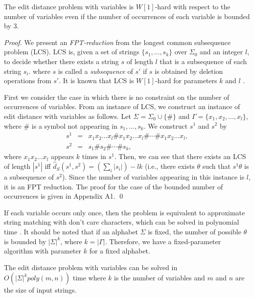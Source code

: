 \documentclass[a4paper]{llncs}
\begin{document}
\begin{theorem}
The edit distance problem with variables is $W[1]$-hard with respect to
the number of variables even if the number of occurrences of each variable
is bounded by 3.
\label{thm:edhard}
\end{theorem}
\begin{proof}
We present an \emph{FPT-reduction} \cite{flum06}
from the longest common subsequence problem (LCS).
LCS is, given a set of strings $\{s_1,\ldots,s_k\}$ over $\Sigma_0$ and 
an integer $l$,
to decide whether there exists a string $s$ of length $l$
that is a subsequence of each string $s_i$.
where $s$ is called a \emph{subsequence} of $s'$ if $s$ is obtained by
deletion operations from $s'$.
It is known that LCS is $W[1]$-hard
for parameters $k$ and $l$ \cite{bodlaender95}.

First we consider the case in which there is no constraint on the number
of occurrences of variables.
From an instance of LCS, we construct an instance of
edit distance with variables as follows.
Let $\Sigma=\Sigma_0 \cup \{ \# \}$ and $\Gamma=\{x_1,x_2,\ldots,x_l\}$,
where $\#$ is a symbol not appearing in $s_1,\ldots,s_k$.
We construct $s^1$ and $s^2$ by
\begin{eqnarray*}
s^1 & = & x_1 x_2 \ldots x_l \# x_1 x_2 \ldots x_l \# \cdots \#
x_1 x_2 \ldots x_l,\\
s^2 & = & s_1 \# s_2 \# \cdots \# s_k,
\end{eqnarray*}
where $x_1 x_2 \ldots x_l$ appears $k$ times in $s^1$.
Then, we can see that
there exists an LCS of length $|s^1|$ iff
$\hat{d}_S(s^1,s^2) = (\sum_i |s_i|)-lk$
(i.e., there exists $\theta$ such that $s^1 \theta$ is a subsequence of
$s^2$).
Since the number of variables appearing in this instance is $l$,
it is an FPT reduction.
The proof for the case of the bounded number of occurrences 
is given in Appendix A1.
\qed
\end{proof}

If each variable occurs only once, then the problem is equivalent
to approximate string matching with don't care characters,
which can be solved in polynomial time \cite{akutsu95}.
It should be noted that if an alphabet $\Sigma$ is fixed,
the number of possible $\theta$ is bounded by $|\Sigma|^k$,
where $k=|\Gamma|$.
Therefore, we have a fixed-parameter algorithm with parameter $k$
for a fixed alphabet.

\begin{proposition}
The edit distance problem with variables can be solved in\\
$O(|\Sigma|^k poly(m,n))$ time where $k$ is the number of variables
and $m$ and $n$ are the size of input strings.
\end{proposition}
\end{document}
